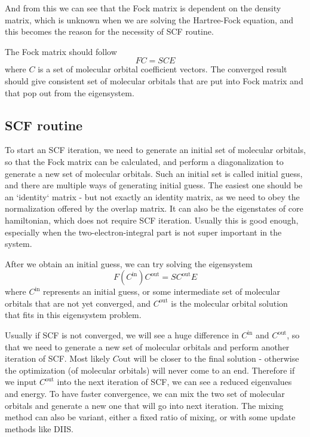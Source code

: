\documentclass[12pt,a4paper,openany,twoside]{article}
\numberwithin{equation}{section}
\begin{document}
And from this we can see that the Fock matrix is dependent on the density matrix, which is unknown when we are solving the Hartree-Fock equation, and this becomes the reason for the necessity of SCF routine.

The Fock matrix should follow
\begin{equation}
    F C = SCE
\end{equation}
where $C$ is a set of molecular orbital coefficient vectors. The converged result should give consistent set of molecular orbitals that are put into Fock matrix and that pop out from the eigensystem.

\subsection{SCF routine}
To start an SCF iteration, we need to generate an initial set of molecular orbitals, so that the Fock matrix can be calculated, and perform a diagonalization to generate a new set of molecular orbitals. Such an initial set is called initial guess, and there are multiple ways of generating initial guess. The easiest one should be an `identity` matrix - but not exactly an identity matrix, as we need to obey the normalization offered by the overlap matrix. It can also be the eigenstates of core hamiltonian, which does not require SCF iteration. Usually this is good enough, especially when the two-electron-integral part is not super important in the system.

After we obtain an initial guess, we can try solving the eigensystem 
\begin{equation}
    F(C^\text{in}) C^{\text{out}} = SC^{\text{out}} E
\end{equation}
where $C^\text{in}$ represents an initial guess, or some intermediate set of molecular orbitals that are not yet converged, and $C^{\text{out}}$ is the molecular orbital solution that fits in this eigensystem problem. 

Usually if SCF is not converged, we will see a huge difference in $C^{\text{in}}$ and $C^{\text{out}}$, so that we need to generate a new set of molecular orbitals and perform another iteration of SCF. Most likely $C{\text{out}}$ will be closer to the final solution - otherwise the optimization (of molecular orbitals) will never come to an end. Therefore if we input $C^{\text{out}}$ into the next iteration of SCF, we can see a reduced eigenvalues and energy. To have faster convergence, we can mix the two set of molecular orbitals and generate a new one that will go into next iteration. The mixing method can also be variant, either a fixed ratio of mixing, or with some update methods like DIIS.
\end{document}
